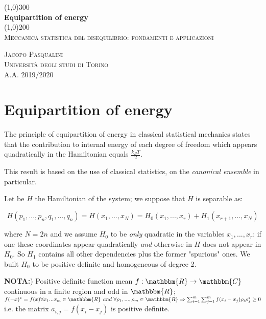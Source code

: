 \documentclass{article}
\begin{document}
\begin{titlepage}
	\begin{center}
	
	\line(1,0){300}\\
	[5mm]
	\huge{\bfseries Equipartition of energy}\\
	[2mm]
	\line(1,0){200}\\
	[2cm]
	\textsc{\Large Meccanica statistica del disequilibrio: fondamenti e applicazioni} \\
	[8cm]
	
	\end{center}
	
	\begin{flushright}
	\textsc{\LARGE Jacopo Pasqualini}\\
	[0.5cm]
	\textsc{\large Università degli studi di Torino\\
	[0.5cm]
	A.A. 2019/2020 }
	\end{flushright}
	
\end{titlepage}

\section{Equipartition of energy}\label{sec:langapp}

The principle of equipartition of energy in classical statistical mechanics states that the contribution to internal energy of each degree of freedom which appears quadratically in the Hamiltonian equals $\frac{k_B T}{2}$.

This result is based on the use of classical statistics, on the \emph{canonical ensemble} in particular.

Let be $H$ the Hamiltonian of the system; we suppose that $H$ is separable as:

$$H(p_1,...,p_{n},q_1,...,q_{n}) = H(x_1,...,x_N) = H_0(x_1,...,x_r) + H_1(x_{r+1},...,x_N)$$

where $N=2n$ and we assume $H_0$ to be \emph{only} quadratic in the variables $x_1,...,x_r$: if one these coordinates appear quadratically \emph{and} otherwise in $H$ does not appear in $H_0$. So $H_1$ contains all other dependencies plus the former "spurious" ones. We built $H_0$ to be positive definite and homogeneous of degree 2. \newline

\textbf{NOTA:}) Positive definite function mean $f:\mathbbm{R} \to \mathbbm{C}$ continuous in a finite region and odd in $\mathbbm{R}$; $f(-x)^*=f(x) \forall x_1...x_m \in \mathbbm{R} \textit{ and } \forall \rho_1,...,\rho_m \in \mathbbm{R} \Rightarrow \sum_{i=1}^{m} \sum_{j=1}^{m} f(x_i-x_j) \rho_i \rho_j^* \geq 0 $ i.e. the matrix $a_{i,j} = f(x_i-x_j)$ is positive definite.
\end{document}
